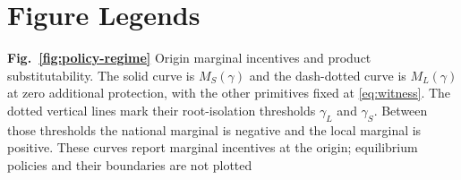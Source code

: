 \section*{Figure Legends}

\noindent\textbf{Fig.~\ref{fig:policy-regime}} Origin marginal incentives and product substitutability. The solid curve is $M_S(\gamma)$ and the dash-dotted curve is $M_L(\gamma)$ at zero additional protection, with the other primitives fixed at \eqref{eq:witness}. The dotted vertical lines mark their root-isolation thresholds $\gamma_L$ and $\gamma_S$. Between those thresholds the national marginal is negative and the local marginal is positive. These curves report marginal incentives at the origin; equilibrium policies and their boundaries are not plotted
